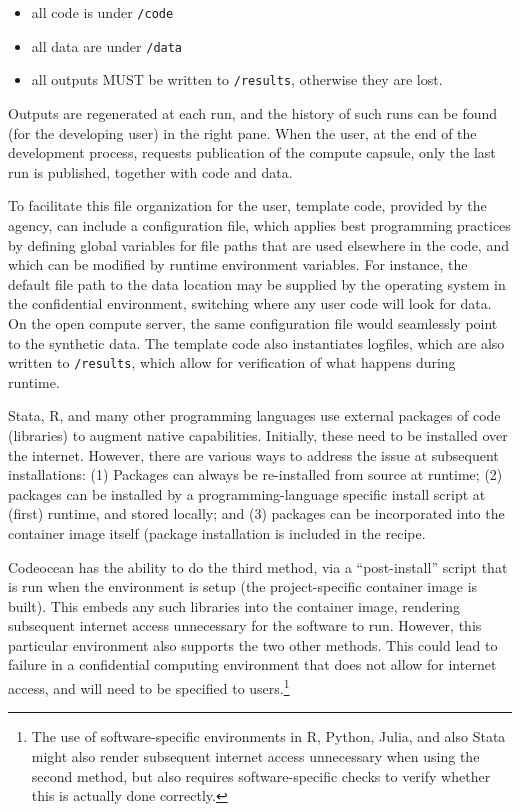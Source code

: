 \documentclass[inline]{hdsr}
\begin{document}
\begin{itemize}
    \item all code is under \texttt{/code}
    \item all data are under \texttt{/data}
    \item all outputs MUST be written to \texttt{/results}, otherwise they are lost.
\end{itemize}

Outputs are regenerated at each run, and the history of such runs can be found (for the developing user) in the right pane. When the user, at the end of the development process, requests publication of the compute capsule, only the last run is published, together with code and data.

To facilitate this file organization for the user,  template code, provided by the agency, can include a configuration file, which applies best programming practices by defining  global variables for file paths that are used elsewhere in the code, and which can be modified by runtime environment variables. For instance, the default file path to the data location may be supplied by the operating system in the confidential environment, switching where any user code will look for data. On the open compute server, the same configuration file would seamlessly point to the synthetic data. The template code also instantiates logfiles, which are also written to \texttt{/results}, which allow for verification of what happens during runtime.



Stata, R, and many other programming languages use external packages of code (libraries) to augment native capabilities. Initially, these need to be installed over the internet. However, there are various ways to address the issue at subsequent installations: (1) Packages can always be re-installed from source at runtime; (2) packages can be installed by a programming-language specific install script at (first) runtime, and stored locally; and (3) packages can be incorporated into the container image itself (package installation is included in the recipe.

Codeocean has the ability to do the third method, via a ``post-install'' script that is run when the environment is setup (the project-specific container image is built). This embeds any such libraries into the container image, rendering subsequent internet access unnecessary for the software to run. However, this particular environment also supports the two other methods. This could lead to failure in a confidential computing environment that does not allow for internet access, and will need to be specified to users.\footnote{The use of software-specific environments in R, Python, Julia, and also Stata might also render subsequent internet access unnecessary when using the second method, but also requires software-specific checks to verify whether this is actually done correctly.}
\end{document}
